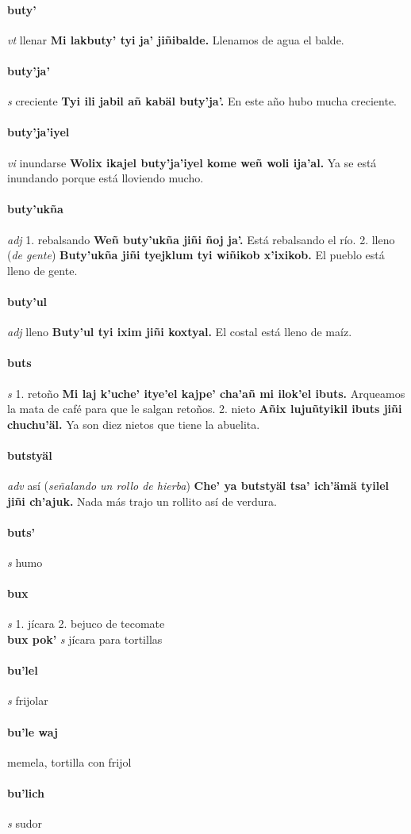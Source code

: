\documentclass{scrbook}
\newcommand{\entry}[1]{\paragraph{#1}}
\newcommand{\onedefinition}[1]{#1.}
\newcommand{\partofspeech}[1]{\textit{#1}}
\newcommand{\spanishtranslation}[1]{#1}
\newcommand{\clarification}[1]{(\textit{#1})}
\newcommand{\cholexample}[1]{\textbf{#1}}
\newcommand{\exampletranslation}[1]{#1}
\newcommand{\secondaryentry}[1]{\\\textbf{#1}}
\newcommand{\secondpartofspeech}[1]{\textit{#1}}
\newcommand{\secondtranslation}[1]{#1}
\begin{document}
\begin{multicols}{2}
\entry{buty'}
\partofspeech{vt}
\spanishtranslation{llenar}
\cholexample{Mi lakbuty' tyi ja' jiñibalde.}
\exampletranslation{Llenamos de agua el balde.}

\entry{buty'ja'}
\partofspeech{s}
\spanishtranslation{creciente}
\cholexample{Tyi ili jabil añ kabäl buty'ja'.}
\exampletranslation{En este año hubo mucha creciente.}

\entry{buty'ja'iyel}
\partofspeech{vi}
\spanishtranslation{inundarse}
\cholexample{Wolix ikajel buty'ja'iyel kome weñ woli ija'al.}
\exampletranslation{Ya se está inundando porque está lloviendo mucho.}

\entry{buty'ukña}
\partofspeech{adj}
\onedefinition{1}
\spanishtranslation{rebalsando}
\cholexample{Weñ buty'ukña jiñi ñoj ja'.}
\exampletranslation{Está rebalsando el río.}
\onedefinition{2}
\spanishtranslation{lleno}
\clarification{de gente}
\cholexample{Buty'ukña jiñi tyejklum tyi wiñikob x'ixikob.}
\exampletranslation{El pueblo está lleno de gente.}

\entry{buty'ul}
\partofspeech{adj}
\spanishtranslation{lleno}
\cholexample{Buty'ul tyi ixim jiñi koxtyal.}
\exampletranslation{El costal está lleno de maíz.}

\entry{buts}
\partofspeech{s}
\onedefinition{1}
\spanishtranslation{retoño}
\cholexample{Mi laj k'uche' itye'el kajpe' cha'añ mi ilok'el ibuts.}
\exampletranslation{Arqueamos la mata de café para que le salgan retoños.}
\onedefinition{2}
\spanishtranslation{nieto}
\cholexample{Añix lujuñtyikil ibuts jiñi chuchu'äl.}
\exampletranslation{Ya son diez nietos que tiene la abuelita.}

\entry{butstyäl}
\partofspeech{adv}
\spanishtranslation{así}
\clarification{señalando un rollo de hierba}
\cholexample{Che' ya butstyäl tsa' ich'ämä tyilel jiñi ch'ajuk.}
\exampletranslation{Nada más trajo un rollito así de verdura.}

\entry{buts'}
\partofspeech{s}
\spanishtranslation{humo}

\entry{bux}
\partofspeech{s}
\onedefinition{1}
\spanishtranslation{jícara}
\onedefinition{2}
\spanishtranslation{bejuco de tecomate}
\secondaryentry{bux pok'}
\secondpartofspeech{s}
\secondtranslation{jícara para tortillas}

\entry{bu'lel}
\partofspeech{s}
\spanishtranslation{frijolar}

\entry{bu'le waj}
\spanishtranslation{memela, tortilla con frijol}

\entry{bu'lich}
\partofspeech{s}
\spanishtranslation{sudor}


\end{multicols}
\end{document}
